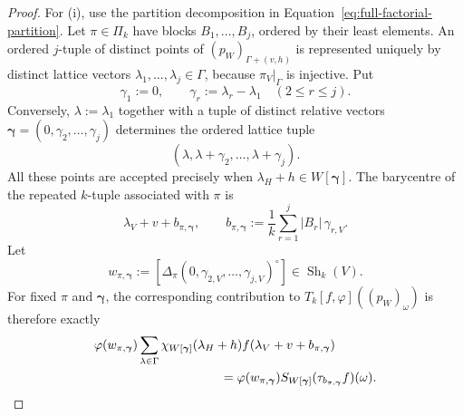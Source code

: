 \documentclass[11pt,reqno,a4paper]{amsart}
\numberwithin{equation}{section}
\theoremstyle{compact}
\theoremstyle{definition}
\theoremstyle{definition}
\newcommand{\Sh}{\operatorname{Sh}}
\begin{document}
\begin{proof}
For \textup{(i)}, use the partition decomposition in
Equation~\eqref{eq:full-factorial-partition}.  Let $\pi\in\Pi_k$ have blocks
$B_1,\ldots,B_j$, ordered by their least elements.  An ordered $j$-tuple of
distinct points of $(p_W)_{\Gamma+(v,h)}$ is represented uniquely by distinct
lattice vectors $\lambda_1,\ldots,\lambda_j\in\Gamma$, because
$\pi_V|_\Gamma$ is injective.  Put
\begin{equation}\label{eq:cap-relative-lattice-vectors}
  \gamma_1:=0,
  \qquad
  \gamma_r:=\lambda_r-\lambda_1\quad(2\leq r\leq j).
\end{equation}
Conversely, $\lambda:=\lambda_1$ together with a tuple of distinct relative
vectors $\boldsymbol\gamma=(0,\gamma_2,\ldots,\gamma_j)$ determines the
ordered lattice tuple
\[
  (\lambda,\lambda+\gamma_2,\ldots,\lambda+\gamma_j).
\]
All these points are accepted precisely when
$\lambda_H+h\in W[\boldsymbol\gamma]$.  The barycentre of the repeated
$k$-tuple associated with $\pi$ is
\begin{equation}\label{eq:cap-weighted-partition-barycentre}
  \lambda_V+v+b_{\pi,\boldsymbol\gamma},
  \qquad
  b_{\pi,\boldsymbol\gamma}
  :=\frac1k\sum_{r=1}^j |B_r|\,\gamma_{r,V}.
\end{equation}
Let
\begin{equation}\label{eq:cap-partition-shape}
  w_{\pi,\boldsymbol\gamma}
  :=\left[
     \Delta_\pi(0,\gamma_{2,V},\ldots,\gamma_{j,V})^\circ
    \right]\in\Sh_k(V).
\end{equation}
For fixed $\pi$ and $\boldsymbol\gamma$, the corresponding contribution to
$T_k[f,\varphi]((p_W)_\omega)$ is therefore exactly
\begin{align}\label{eq:cap-one-derived-contribution}
 &\varphi(w_{\pi,\boldsymbol\gamma})
   \sum_{\lambda\in\Gamma}
     \chi_{W[\boldsymbol\gamma]}(\lambda_H+h)
     f(\lambda_V+v+b_{\pi,\boldsymbol\gamma}) \notag\\
 &\hspace{35mm}=
 \varphi(w_{\pi,\boldsymbol\gamma})
 S_{W[\boldsymbol\gamma]}
   (\tau_{b_{\pi,\boldsymbol\gamma}}f)(\omega).
\end{align}


\end{proof}
\end{document}
